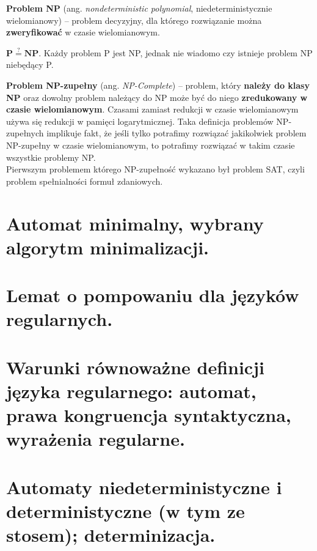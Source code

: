 \documentclass[12pt]{article}
\begin{document}
    \begin{definition}
        \textbf{Problem NP} (ang. \textit{nondeterministic polynomial}, niedeterministycznie wielomianowy) – problem
        decyzyjny, dla którego rozwiązanie można \textbf{zweryfikować} w czasie wielomianowym.
    \end{definition}

    \begin{theorem}
        $\mathbf{P \stackrel{?}{=} NP}$. Każdy problem P jest NP, jednak nie wiadomo czy istnieje problem NP niebędący P.
    \end{theorem}

    \begin{definition}
        \textbf{Problem NP-zupełny} (ang. \textit{NP-Complete}) – problem, który \textbf{należy do klasy NP} oraz dowolny
        problem należący do NP może być do niego \textbf{zredukowany w czasie wielomianowym}. Czasami zamiast redukcji w
        czasie wielomianowym używa się redukcji w pamięci logarytmicznej. Taka definicja problemów NP-zupełnych
        implikuje fakt, że jeśli tylko potrafimy rozwiązać jakikolwiek problem NP-zupełny w czasie wielomianowym,
        to potrafimy rozwiązać w takim czasie wszystkie problemy NP.\\

        Pierwszym problemem którego NP-zupełność wykazano był problem SAT, czyli problem spełnialności formuł zdaniowych.
    \end{definition}

    \newpage

    \section{Automat minimalny, wybrany algorytm minimalizacji.}
    \section{Lemat o pompowaniu dla języków regularnych.}
    \section{Warunki równoważne definicji języka regularnego: automat, prawa kongruencja syntaktyczna, wyrażenia regularne.}
    \section{Automaty niedeterministyczne i deterministyczne (w tym ze stosem); determinizacja.}
\end{document}
